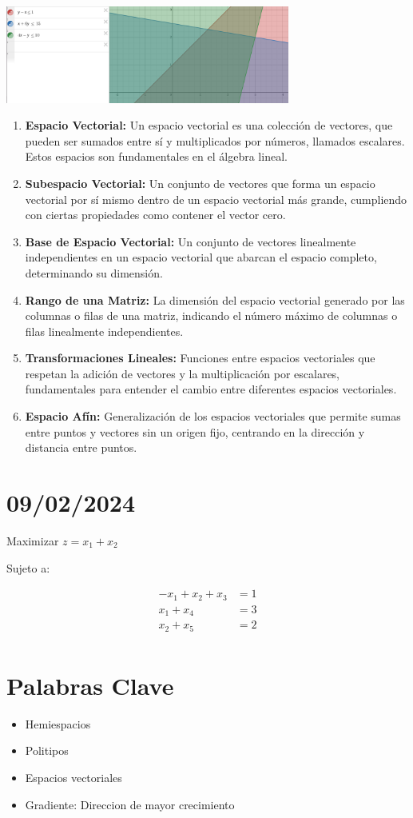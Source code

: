 \documentclass{article}
\begin{document}
\begin{center}
    \includegraphics[width=0.7\textwidth]{./imagenes/imagen2.png}
\end{center}

\begin{enumerate}
    \item \textbf{Espacio Vectorial:} Un espacio vectorial es una colección de vectores, que pueden ser sumados entre sí y multiplicados por números, llamados escalares. Estos espacios son fundamentales en el álgebra lineal.
    \item \textbf{Subespacio Vectorial:} Un conjunto de vectores que forma un espacio vectorial por sí mismo dentro de un espacio vectorial más grande, cumpliendo con ciertas propiedades como contener el vector cero.
    \item \textbf{Base de Espacio Vectorial:} Un conjunto de vectores linealmente independientes en un espacio vectorial que abarcan el espacio completo, determinando su dimensión.
    \item \textbf{Rango de una Matriz:} La dimensión del espacio vectorial generado por las columnas o filas de una matriz, indicando el número máximo de columnas o filas linealmente independientes.
    \item \textbf{Transformaciones Lineales:} Funciones entre espacios vectoriales que respetan la adición de vectores y la multiplicación por escalares, fundamentales para entender el cambio entre diferentes espacios vectoriales.
    \item \textbf{Espacio Afín:} Generalización de los espacios vectoriales que permite sumas entre puntos y vectores sin un origen fijo, centrando en la dirección y distancia entre puntos.
\end{enumerate}
\newpage
\section{09/02/2024}

Maximizar \( z = x_1 + x_2 \)

Sujeto a:

\begin{align*}
    -x_1 + x_2 + x_3 & = 1 \\
    x_1 + x_4        & = 3 \\
    x_2 + x_5        & = 2 \\
\end{align*}

\section*{Palabras Clave}

\begin{itemize}
    \item Hemiespacios
    \item Politipos
    \item Espacios vectoriales
    \item Gradiente: Direccion de mayor crecimiento
\end{itemize}
\end{document}

